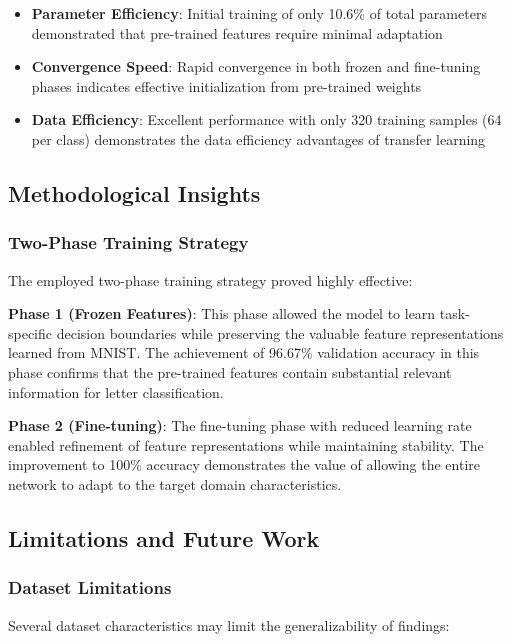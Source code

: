 \documentclass[12pt,a4paper]{article}
\begin{document}
\begin{itemize}
    \item \textbf{Parameter Efficiency}: Initial training of only 10.6\% of total parameters demonstrated that pre-trained features require minimal adaptation
    \item \textbf{Convergence Speed}: Rapid convergence in both frozen and fine-tuning phases indicates effective initialization from pre-trained weights
    \item \textbf{Data Efficiency}: Excellent performance with only 320 training samples (64 per class) demonstrates the data efficiency advantages of transfer learning
\end{itemize}

\subsection{Methodological Insights}

\subsubsection{Two-Phase Training Strategy}

The employed two-phase training strategy proved highly effective:

\textbf{Phase 1 (Frozen Features)}: This phase allowed the model to learn task-specific decision boundaries while preserving the valuable feature representations learned from MNIST. The achievement of 96.67\% validation accuracy in this phase confirms that the pre-trained features contain substantial relevant information for letter classification.

\textbf{Phase 2 (Fine-tuning)}: The fine-tuning phase with reduced learning rate enabled refinement of feature representations while maintaining stability. The improvement to 100\% accuracy demonstrates the value of allowing the entire network to adapt to the target domain characteristics.

\subsection{Limitations and Future Work}

\subsubsection{Dataset Limitations}

Several dataset characteristics may limit the generalizability of findings:
\end{document}
